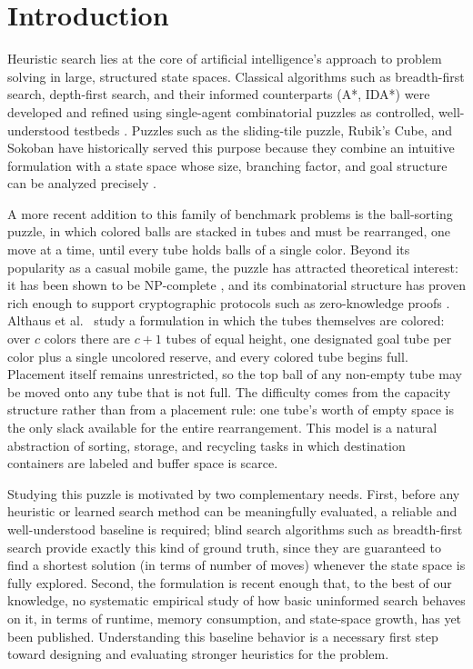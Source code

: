 \documentclass[letterpaper]{article}
\begin{document}
\section{Introduction}

Heuristic search lies at the core of artificial intelligence's approach to
problem solving in large, structured state spaces. Classical algorithms
such as breadth-first search, depth-first search, and their informed
counterparts (A*, IDA*) were developed and refined using single-agent
combinatorial puzzles as controlled, well-understood testbeds
\cite{hart1968,korf1985,russell2020}. Puzzles such as the sliding-tile
puzzle, Rubik's Cube, and Sokoban have historically served this purpose
because they combine an intuitive formulation with a state space whose
size, branching factor, and goal structure can be analyzed precisely
\cite{ratner1986,korf1997,culberson1998,junghanns2001}.

A more recent addition to this family of benchmark problems is the
ball-sorting puzzle, in which colored balls are stacked in tubes and must
be rearranged, one move at a time, until every tube holds balls of a
single color. Beyond its popularity as a casual mobile game, the puzzle
has attracted theoretical interest: it has been shown to be NP-complete
\cite{ito2023}, and its combinatorial structure has proven rich
enough to support cryptographic protocols such as zero-knowledge proofs
\cite{ruangwises2023}.
Althaus et al.\ \cite{althaus2025} study a formulation in which the tubes
themselves are colored: over $c$ colors there are $c+1$ tubes of equal
height, one designated goal tube per color plus a single uncolored reserve,
and every colored tube begins full. Placement itself remains unrestricted,
so the top ball of any non-empty tube may be moved onto any tube that is
not full. The difficulty comes from the capacity structure rather than from
a placement rule: one tube's worth of empty space is the only slack
available for the entire rearrangement. This model is a natural abstraction
of sorting, storage, and recycling tasks in which destination containers
are labeled and buffer space is scarce.

Studying this puzzle is motivated by two complementary needs.
First, before any heuristic or learned search method can be meaningfully
evaluated, a reliable and well-understood baseline is required; blind
search algorithms such as breadth-first search provide exactly this kind of
ground truth, since they are guaranteed to find a shortest solution (in
terms of number of moves) whenever the state space is fully explored.
Second, the formulation is recent enough that, to the best of our
knowledge, no systematic empirical study of how basic uninformed search
behaves on it, in terms of runtime, memory consumption, and state-space
growth, has yet been published. Understanding this baseline behavior is a
necessary first step toward designing and evaluating stronger heuristics
for the problem.
\end{document}
